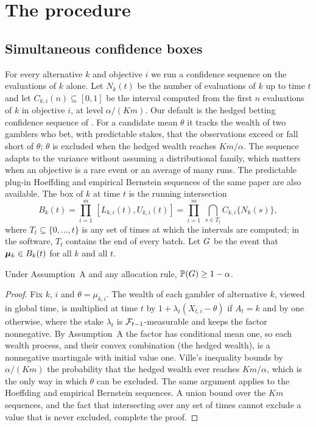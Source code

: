 \section{The procedure}\label{sec:method}

\subsection{Simultaneous confidence boxes}\label{sec:boxes}

For every alternative $k$ and objective $i$ we run a confidence sequence on the evaluations of $k$ alone. Let $N_k(t)$ be the number of evaluations of $k$ up to time $t$ and let $C_{k,i}(n)\subseteq[0,1]$ be the interval computed from the first $n$ evaluations of $k$ in objective $i$, at level $\alpha/(Km)$. Our default is the hedged betting confidence sequence of \citet[Theorem~3]{waudbysmith2024}. For a candidate mean $\theta$ it tracks the wealth of two gamblers who bet, with predictable stakes, that the observations exceed or fall short of $\theta$; $\theta$ is excluded when the hedged wealth reaches $Km/\alpha$. The sequence adapts to the variance without assuming a distributional family, which matters when an objective is a rare event or an average of many runs. The predictable plug-in Hoeffding and empirical Bernstein sequences of the same paper are also available. The box of $k$ at time $t$ is the running intersection
\[
B_k(t)=\prod_{i=1}^m\,[L_{k,i}(t),U_{k,i}(t)]=\prod_{i=1}^m\ \bigcap_{s\in T_t} C_{k,i}\{N_k(s)\},
\]
where $T_t\subseteq\{0,\dots,t\}$ is any set of times at which the intervals are computed; in the software, $T_t$ contains the end of every batch. Let $G$ be the event that $\bm{\mu}_k\in B_k(t)$ for all $k$ and all $t$.

\begin{lemma}\label{lem:boxes}
Under Assumption~A and any allocation rule, $\mathbb{P}(G)\ge1-\alpha$.
\end{lemma}

\begin{proof}
Fix $k$, $i$ and $\theta=\mu_{k,i}$. The wealth of each gambler of alternative $k$, viewed in global time, is multiplied at time $t$ by $1+\lambda_t(X_{t,i}-\theta)$ if $A_t=k$ and by one otherwise, where the stake $\lambda_t$ is $\mathcal{F}_{t-1}$-measurable and keeps the factor nonnegative. By Assumption~A the factor has conditional mean one, so each wealth process, and their convex combination (the hedged wealth), is a nonnegative martingale with initial value one. Ville's inequality \citep{ville1939} bounds by $\alpha/(Km)$ the probability that the hedged wealth ever reaches $Km/\alpha$, which is the only way in which $\theta$ can be excluded. The same argument applies to the Hoeffding and empirical Bernstein sequences. A union bound over the $Km$ sequences, and the fact that intersecting over any set of times cannot exclude a value that is never excluded, complete the proof.
\end{proof}

